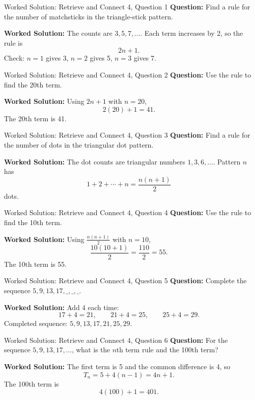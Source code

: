 \documentclass{beamer}
\begin{document}
\begin{frame}{Worked Solution: Retrieve and Connect 4, Question 1}
  \hypertarget{work-st4}{}
  \textbf{Question:} Find a rule for the number of matchsticks in the triangle-stick pattern.

  \textbf{Worked Solution:} The counts are \(3, 5, 7, \dots\). Each term increases by 2, so the rule is
  \[
    2n+1.
  \]
  Check: \(n=1\) gives 3, \(n=2\) gives 5, \(n=3\) gives 7.
\end{frame}

\begin{frame}{Worked Solution: Retrieve and Connect 4, Question 2}
  \textbf{Question:} Use the rule to find the 20th term.

  \textbf{Worked Solution:} Using \(2n+1\) with \(n=20\),
  \[
    2(20)+1=41.
  \]
  The 20th term is 41.
\end{frame}

\begin{frame}{Worked Solution: Retrieve and Connect 4, Question 3}
  \textbf{Question:} Find a rule for the number of dots in the triangular dot pattern.

  \textbf{Worked Solution:} The dot counts are triangular numbers \(1, 3, 6, \dots\). Pattern \(n\) has
  \[
    1+2+\cdots+n=\frac{n(n+1)}{2}
  \]
  dots.
\end{frame}

\begin{frame}{Worked Solution: Retrieve and Connect 4, Question 4}
  \textbf{Question:} Use the rule to find the 10th term.

  \textbf{Worked Solution:} Using \(\frac{n(n+1)}{2}\) with \(n=10\),
  \[
    \frac{10(10+1)}{2}=\frac{110}{2}=55.
  \]
  The 10th term is 55.
\end{frame}

\begin{frame}{Worked Solution: Retrieve and Connect 4, Question 5}
  \textbf{Question:} Complete the sequence \(5, 9, 13, 17, \_, \_, \_. \)

  \textbf{Worked Solution:} Add 4 each time:
  \[
    17+4=21,\qquad 21+4=25,\qquad 25+4=29.
  \]
  Completed sequence: \(5, 9, 13, 17, 21, 25, 29\).
\end{frame}

\begin{frame}{Worked Solution: Retrieve and Connect 4, Question 6}
  \textbf{Question:} For the sequence \(5, 9, 13, 17, \dots\), what is the \(n\)th term rule and the 100th term?

  \textbf{Worked Solution:} The first term is 5 and the common difference is 4, so
  \[
    T_n = 5 + 4(n-1) = 4n+1.
  \]
  The 100th term is
  \[
    4(100)+1=401.
  \]
\end{frame}
\end{document}
